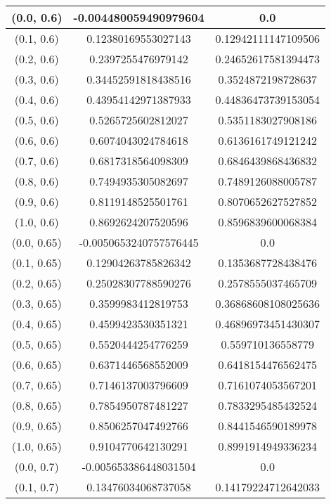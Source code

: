 \begin{table}[H]
\begin{tabular}{|c|c|c|}
\hline
(0.0, 0.6) & -0.004480059490979604 & 0.0 \\
\hline
(0.1, 0.6) & 0.12380169553027143 & 0.12942111147109506 \\
\hline
(0.2, 0.6) & 0.2397255476979142 & 0.24652617581394473 \\
\hline
(0.3, 0.6) & 0.34452591818438516 & 0.3524872198728637 \\
\hline
(0.4, 0.6) & 0.43954142971387933 & 0.44836473739153054 \\
\hline
(0.5, 0.6) & 0.5265725602812027 & 0.5351183027908186 \\
\hline
(0.6, 0.6) & 0.6074043024784618 & 0.6136161749121242 \\
\hline
(0.7, 0.6) & 0.6817318564098309 & 0.6846439868436832 \\
\hline
(0.8, 0.6) & 0.7494935305082697 & 0.7489126088005787 \\
\hline
(0.9, 0.6) & 0.8119148525501761 & 0.8070652627527852 \\
\hline
(1.0, 0.6) & 0.8692624207520596 & 0.8596839600068384 \\
\hline
\hline
(0.0, 0.65) & -0.0050653240757576445 & 0.0 \\
\hline
(0.1, 0.65) & 0.12904263785826342 & 0.1353687728438476 \\
\hline
(0.2, 0.65) & 0.25028307788590276 & 0.2578555037465709 \\
\hline
(0.3, 0.65) & 0.3599983412819753 & 0.36868608108025636 \\
\hline
(0.4, 0.65) & 0.4599423530351321 & 0.46896973451430307 \\
\hline
(0.5, 0.65) & 0.5520444254776259 & 0.559710136558779 \\
\hline
(0.6, 0.65) & 0.6371446568552009 & 0.6418154476562475 \\
\hline
(0.7, 0.65) & 0.7146137003796609 & 0.7161074053567201 \\
\hline
(0.8, 0.65) & 0.7854950787481227 & 0.7833295485432524 \\
\hline
(0.9, 0.65) & 0.8506257047492766 & 0.8441546590189978 \\
\hline
(1.0, 0.65) & 0.9104770642130291 & 0.8991914949336234 \\
\hline
\hline
(0.0, 0.7) & -0.005653386448031504 & 0.0 \\
\hline
(0.1, 0.7) & 0.13476034068737058 & 0.14179224712642033 \\
\hline

\end{tabular}
\end{table}

